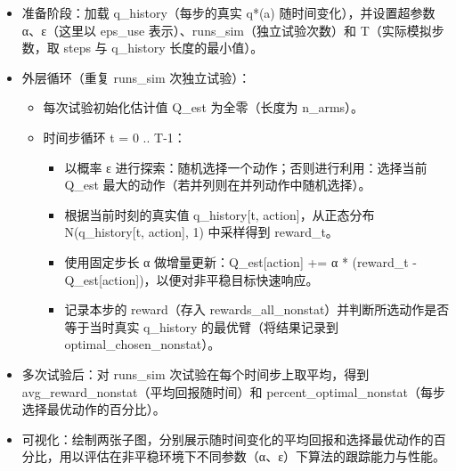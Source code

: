 \documentclass[11pt]{ctexart}
\providecommand{\tightlist}{%
      \setlength{\itemsep}{0pt}\setlength{\parskip}{0pt}}
\begin{document}
\begin{itemize}
\tightlist
\item
  准备阶段：加载 q\_history（每步的真实 q*(a) 随时间变化），并设置超参数
  α、ε（这里以 eps\_use 表示）、runs\_sim（独立试验次数）和
  T（实际模拟步数，取 steps 与 q\_history 长度的最小值）。
\item
  外层循环（重复 runs\_sim 次独立试验）：

  \begin{itemize}
  \tightlist
  \item
    每次试验初始化估计值 Q\_est 为全零（长度为 n\_arms）。
  \item
    时间步循环 t = 0 .. T-1：

    \begin{itemize}
    \tightlist
    \item
      以概率 ε 进行探索：随机选择一个动作；否则进行利用：选择当前 Q\_est
      最大的动作（若并列则在并列动作中随机选择）。
    \item
      根据当前时刻的真实值 q\_history{[}t, action{]}，从正态分布
      N(q\_history{[}t, action{]}, 1) 中采样得到 reward\_t。
    \item
      使用固定步长 α 做增量更新：Q\_est{[}action{]} += α * (reward\_t -
      Q\_est{[}action{]})，以便对非平稳目标快速响应。
    \item
      记录本步的 reward（存入
      rewards\_all\_nonstat）并判断所选动作是否等于当时真实 q\_history
      的最优臂（将结果记录到 optimal\_chosen\_nonstat）。
    \end{itemize}
  \end{itemize}
\item
  多次试验后：对 runs\_sim 次试验在每个时间步上取平均，得到
  avg\_reward\_nonstat（平均回报随时间）和
  percent\_optimal\_nonstat（每步选择最优动作的百分比）。
\item
  可视化：绘制两张子图，分别展示随时间变化的平均回报和选择最优动作的百分比，用以评估在非平稳环境下不同参数（α、ε）下算法的跟踪能力与性能。
\end{itemize}
\end{document}
